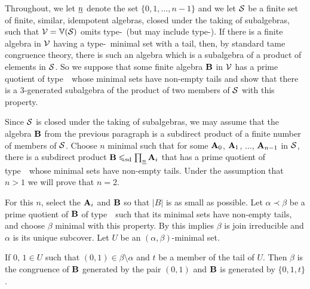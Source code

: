 \medskip

Throughout, we let $\underline{n}$ denote the set $\{0,1,\dots, n-1\}$ and 
we let $\mathcal{S}$ be a finite 
set of finite,
similar, idempotent algebras, closed under the taking of 
subalgebras, such that
$\mathcal{V} = \operatorname{\mathbb{V}}(\mathcal{S})$ omits type-\utyp\ (but may include type-\styp).
If there is a finite algebra in $\mathcal{V}$ having a type-\atyp\ minimal 
set with a tail, then, by standard tame congruence theory, there
is such an algebra which is a subalgebra of a product 
of elements in $\mathcal{S}$. 
So we suppose that some finite algebra
$\mathbf{B}$ in $\mathcal{V}$ has a prime quotient of type~\atyp\ whose 
minimal sets 
have non-empty
tails and show that there is a 3-generated 
subalgebra of the
product of two members of $\mathcal{S}$ with this property.

Since $\mathcal{S}$ is closed under the taking of subalgebras,
we may assume that the algebra $\mathbf{B}$ from the previous paragraph is a subdirect
product of a finite number of members of $\mathcal{S}$. Choose $n$ minimal such that for
some $\mathbf{A}_0$, $\mathbf{A}_1$, $\dots$, $\mathbf{A}_{n-1}$ in $\mathcal{S}$, there is a subdirect
product $\mathbf{B} \leqslant_{\mathrm{sd}} \prod_{\underline{n}} \mathbf{A}_i$
that has a prime quotient of type~\atyp\ whose minimal sets have
non-empty tails.
Under the assumption that $n > 1$ we will prove that $n = 2$.

For this $n$, select the $\mathbf{A}_i$ and $\mathbf{B}$ so that $|B|$ is as small as possible.
Let $\alpha \prec \beta$ be a prime quotient of $\mathbf{B}$ 
of type~\atyp\ such that its minimal sets have
non-empty tails, and choose $\beta$ minimal with this property.
By \cite[Lemma 6.2]{HM:1988} this implies $\beta$ is join 
irreducible and $\alpha$ is its unique subcover.
Let $U$ be an $(\alpha, \beta)$-minimal set. 


\begin{lemma}
\label{lem:fv_3-1}
If\/ $0$, $1 \in U$ such that $(0,1) \in \beta \setminus \alpha$ and
$t$ be a member of the tail of $U$. Then $\beta$ is the 
congruence of $\mathbf{B}$
generated by the pair $(0,1)$ and $\mathbf{B}$ is generated 
by $\{0, 1, t\}$.
\end{lemma}

